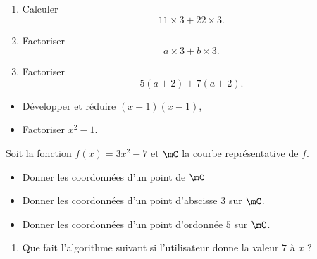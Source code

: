 \begin{MentalActivity}
\begin{mental}
    \begin{enumerate}
        \item
            Calculer
            \begin{equation*}
                11\times 3+22\times 3.
            \end{equation*}
        \item
            Factoriser
            \begin{equation*}
                a\times 3+b\times 3.
            \end{equation*}
        \item
            Factoriser
            \begin{equation*}
                5(a+2)+7(a+2).
            \end{equation*}
    \end{enumerate}
\end{mental}

\begin{mental}
        \begin{itemize}
            \item
    Développer et réduire $(x+1)(x-1)$, 
\item
    Factoriser $x^2-1$.
        \end{itemize}
\end{mental}


\begin{mental}
            Soit la fonction \( f(x)=3x^2-7\) et \( \mC\) la courbe représentative de \( f\).
            \begin{itemize}
            \item Donner les coordonnées d'un point de \( \mC\)
            \item Donner les coordonnées d'un point d'abscisse \( 3\) sur \( \mC\).
            \item Donner les coordonnées d'un point d'ordonnée \( 5\) sur \( \mC\).
            \end{itemize}
\end{mental}

\begin{mental}
    \begin{enumerate}
        \item
            
    Que fait l'algorithme suivant si l'utilisateur donne la valeur \( 7\) à $x$ ?


\end{enumerate}
\end{mental}
\end{MentalActivity}
